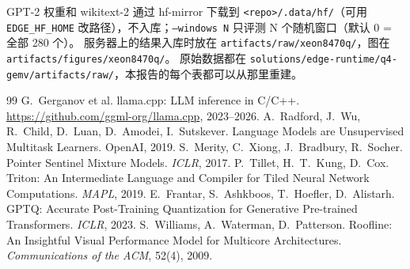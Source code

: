 \documentclass[11pt,a4paper]{ctexart}
\begin{document}
GPT-2 权重和 wikitext-2 通过 hf-mirror 下载到 \nolinkurl{<repo>/.data/hf/}（可用 \texttt{EDGE\_HF\_HOME} 改路径），不入库；\texttt{--windows N} 只评测 N 个随机窗口（默认 0 = 全部 280 个）。
服务器上的结果入库时放在 \nolinkurl{artifacts/raw/xeon8470q/}，图在 \nolinkurl{artifacts/figures/xeon8470q/}。
原始数据都在 \nolinkurl{solutions/edge-runtime/q4-gemv/artifacts/raw/}，本报告的每个表都可以从那里重建。


\begin{thebibliography}{99}
 G.~Gerganov et al. llama.cpp: LLM inference in C/C++. \url{https://github.com/ggml-org/llama.cpp}, 2023--2026.
 A.~Radford, J.~Wu, R.~Child, D.~Luan, D.~Amodei, I.~Sutskever. Language Models are Unsupervised Multitask Learners. OpenAI, 2019.
 S.~Merity, C.~Xiong, J.~Bradbury, R.~Socher. Pointer Sentinel Mixture Models. \emph{ICLR}, 2017.
 P.~Tillet, H.~T.~Kung, D.~Cox. Triton: An Intermediate Language and Compiler for Tiled Neural Network Computations. \emph{MAPL}, 2019.
 E.~Frantar, S.~Ashkboos, T.~Hoefler, D.~Alistarh. GPTQ: Accurate Post-Training Quantization for Generative Pre-trained Transformers. \emph{ICLR}, 2023.
 S.~Williams, A.~Waterman, D.~Patterson. Roofline: An Insightful Visual Performance Model for Multicore Architectures. \emph{Communications of the ACM}, 52(4), 2009.
\end{thebibliography}
\end{document}
